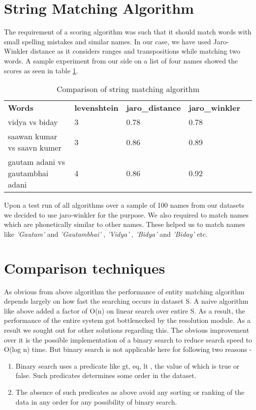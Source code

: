 \section{String Matching Algorithm}
        The requirement of a scoring algorithm was such that it should match words with small spelling mistakes and similar names. In our case, we have used Jaro-Winkler distance as it considers ranges and transpositions while matching two words. A sample experiment from our side on a list of four names showed the scores as seen in table \ref{table:1}.
    \begin{table}[H]
    \centering
    \caption{Comparison of string matching algorithm}
    \label{table:1}
    \begin{tabular}{|l|l|l|l|l}
    \cline{1-4}
    \textbf{Words}                   & \textbf{levenshtein} & \textbf{jaro\_distance} & \textbf{jaro\_winkler} &  \\ \cline{1-4}
    vidya vs biday                   & 3                    & 0.78                    & 0.78                   &  \\ \cline{1-4}
    saawan kumar vs saavn kumer      & 3                    & 0.86                    & 0.89                   &  \\ \cline{1-4}
    gautam adani vs gautambhai adani & 4                    & 0.86                    & 0.92                   &  \\ \cline{1-4}
    \end{tabular}
    \end{table}
        Upon a test run of all algorithms over a sample of 100 names from our datasets we decided to use jaro-winkler for the purpose. We also required to match names which are phonetically similar to other names. These helped us to match names like \textit{ 'Gautam' } and \textit{ 'Gautambhai' }, \textit{ 'Vidya' }, \textit{ 'Bidya' } and \textit{ 'Biday' } etc.

\section{Comparison techniques}
        As obvious from above algorithm the performance of entity matching algorithm depends largely on how fast the searching occurs in dataset S. A naive algorithm like above added a factor of O(n) on linear search over entire S. As a result, the performance of the entire system got bottlenecked by the resolution module. As a result we sought out for other solutions regarding this. The obvious improvement over it is the possible implementation of a binary search to reduce search speed to O(log n) time. But binary search is not applicable here for following two reasons -
            \begin{enumerate}
                \item Binary search uses a predicate like gt, eq, lt , the value of which is true or false. Such predicates determines some order in the dataset. 
                \item The absence of such predicates as above avoid any sorting or ranking of the data in any order for any possibility of binary search.
        
            \end{enumerate}

